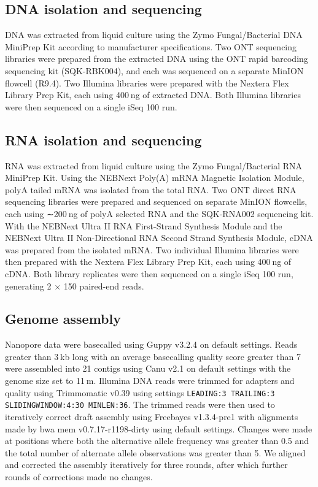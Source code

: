 \subsection{DNA isolation and sequencing}
\label{sec:methods}

DNA was extracted from liquid culture using the Zymo Fungal/Bacterial DNA MiniPrep Kit according to manufacturer specifications. Two ONT sequencing libraries were prepared from the extracted DNA using the ONT rapid barcoding sequencing kit (SQK-RBK004), and each was sequenced on a separate MinION flowcell (R9.4). Two Illumina libraries were prepared with the Nextera Flex Library Prep Kit, each using 400 ng of extracted DNA. Both Illumina libraries were then sequenced on a single iSeq 100 run.

\subsection{RNA isolation and sequencing}
\label{sec:methods}

RNA was extracted from liquid culture using the Zymo Fungal/Bacterial RNA MiniPrep Kit. Using the NEBNext Poly(A) mRNA Magnetic Isolation Module, polyA tailed mRNA was isolated from the total RNA. Two ONT direct RNA sequencing libraries were prepared and sequenced on separate MinION flowcells, each using ∼200 ng of polyA selected RNA and the SQK-RNA002 sequencing kit. With the NEBNext Ultra II RNA First-Strand Synthesis Module and the NEBNext Ultra II Non-Directional RNA Second Strand Synthesis Module, cDNA was prepared from the isolated mRNA. Two individual Illumina libraries were then prepared with the Nextera Flex Library Prep Kit, each using 400 ng of cDNA. Both library replicates were then sequenced on a single iSeq 100 run, generating 2 × 150 paired-end reads.

\subsection{Genome assembly}
\label{sec:methods}

Nanopore data were basecalled using Guppy v3.2.4 on default settings. Reads greater than 3 kb long with an average basecalling quality score greater than 7 were assembled into 21 contigs using Canu v2.1 \citep{Koren2017-wf} on default settings with the genome size set to 11 m. Illumina DNA reads were trimmed for adapters and quality using Trimmomatic v0.39 \citep{Bolger2014-ax} using settings \texttt{LEADING:3 TRAILING:3 SLIDINGWINDOW:4:30 MINLEN:36}. The trimmed reads were then used to iteratively correct draft assembly using Freebayes v1.3.4-pre1 \citep{Garrison2012-iq} with alignments made by bwa mem v0.7.17-r1198-dirty \citep{Li2013-ec} using default settings. Changes were made at positions where both the alternative allele frequency was greater than 0.5 and the total number of alternate allele observations was greater than 5. We aligned and corrected the assembly iteratively for three rounds, after which further rounds of corrections made no changes.

